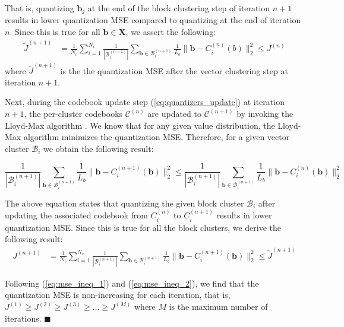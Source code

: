 That is, quantizing $\bm{b}_j$ at the end of the block clustering step of iteration $n+1$ results in lower quantization MSE compared to quantizing at the end of iteration $n$. Since this is true for all $\bm{b} \in \bm{X}$, we assert the following:
\begin{equation}
\begin{split}
\label{eq:mse_ineq_1}
    \tilde{J}^{(n+1)} &= \frac{1}{N_c} \sum_{i=1}^{N_c} \frac{1}{|\mathcal{B}_{i}^{(n+1)}|}\sum_{\bm{b} \in \mathcal{B}_{i}^{(n+1)}} \frac{1}{L_b}\lVert \bm{b} - C_i^{(n)}(b)\rVert^2_2 \le J^{(n)}
\end{split}
\end{equation}
where $\tilde{J}^{(n+1)}$ is the the quantization MSE after the vector clustering step at iteration $n+1$.

Next, during the codebook update step (\ref{eq:quantizers_update}) at iteration $n+1$, the per-cluster codebooks $\mathcal{C}^{(n)}$ are updated to $\mathcal{C}^{(n+1)}$ by invoking the Lloyd-Max algorithm \citep{Lloyd}. We know that for any given value distribution, the Lloyd-Max algorithm minimizes the quantization MSE. Therefore, for a given vector cluster $\mathcal{B}_i$ we obtain the following result:

\begin{equation}
    \frac{1}{|\mathcal{B}_{i}^{(n+1)}|}\sum_{\bm{b} \in \mathcal{B}_{i}^{(n+1)}} \frac{1}{L_b}\lVert \bm{b}- C_i^{(n+1)}(\bm{b})\rVert^2_2 \le \frac{1}{|\mathcal{B}_{i}^{(n+1)}|}\sum_{\bm{b} \in \mathcal{B}_{i}^{(n+1)}} \frac{1}{L_b}\lVert \bm{b}- C_i^{(n)}(\bm{b})\rVert^2_2
\end{equation}

The above equation states that quantizing the given block cluster $\mathcal{B}_i$ after updating the associated codebook from $C_i^{(n)}$ to $C_i^{(n+1)}$ results in lower quantization MSE. Since this is true for all the block clusters, we derive the following result: 
\begin{equation}
\begin{split}
\label{eq:mse_ineq_2}
     J^{(n+1)} &= \frac{1}{N_c} \sum_{i=1}^{N_c} \frac{1}{|\mathcal{B}_{i}^{(n+1)}|}\sum_{\bm{b} \in \mathcal{B}_{i}^{(n+1)}} \frac{1}{L_b}\lVert \bm{b}- C_i^{(n+1)}(\bm{b})\rVert^2_2  \le \tilde{J}^{(n+1)}   
\end{split}
\end{equation}

Following (\ref{eq:mse_ineq_1}) and (\ref{eq:mse_ineq_2}), we find that the quantization MSE is non-increasing for each iteration, that is, $J^{(1)} \ge J^{(2)} \ge J^{(3)} \ge \ldots \ge J^{(M)}$ where $M$ is the maximum number of iterations. 
\hfill $\blacksquare$


